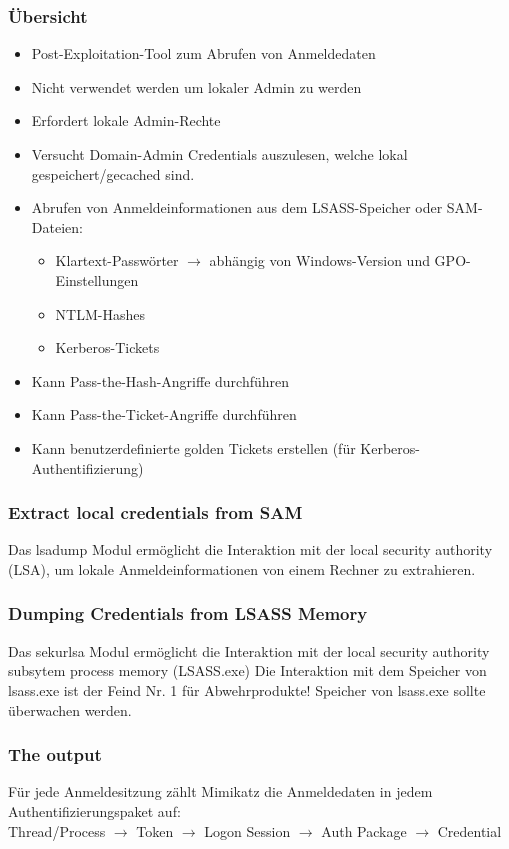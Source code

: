 \subsubsection{Übersicht}
\begin{itemize}
    \item Post-Exploitation-Tool zum Abrufen von Anmeldedaten
    \item Nicht verwendet werden um lokaler Admin zu werden
    \item Erfordert lokale Admin-Rechte
    \item Versucht Domain-Admin Credentials auszulesen, welche lokal gespeichert/gecached sind.
    \item Abrufen von Anmeldeinformationen aus dem LSASS-Speicher oder SAM-Dateien:
    \begin{itemize}
        \item Klartext-Passwörter $\rightarrow$  abhängig von Windows-Version und GPO-Einstellungen
        \item NTLM-Hashes
        \item Kerberos-Tickets
    \end{itemize}
    \item Kann Pass-the-Hash-Angriffe durchführen
    \item Kann Pass-the-Ticket-Angriffe durchführen
    \item Kann benutzerdefinierte golden Tickets erstellen (für Kerberos-Authentifizierung)
\end{itemize}

\subsubsection{Extract local credentials from SAM}
Das lsadump Modul ermöglicht die Interaktion mit der local security authority (LSA), um lokale Anmeldeinformationen von einem Rechner zu extrahieren.

\subsubsection{Dumping Credentials from LSASS Memory}
Das sekurlsa Modul ermöglicht die Interaktion mit der local security authority subsytem process memory (LSASS.exe)
Die Interaktion mit dem Speicher von lsass.exe ist der Feind Nr. 1 für Abwehrprodukte! Speicher von lsass.exe sollte überwachen werden.

\subsubsection{The output}
Für jede Anmeldesitzung zählt Mimikatz die Anmeldedaten in jedem Authentifizierungspaket auf:\\
Thread/Process $\rightarrow$ Token $\rightarrow$ Logon Session $\rightarrow$ Auth Package $\rightarrow$ Credential

